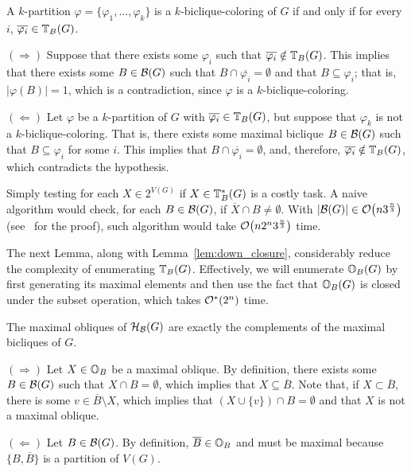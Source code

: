 \begin{lemma}
    \label{lem:transversal_colorings}
    A $k$-partition $\varphi = \{\varphi_1, \dots, \varphi_k\}$ is a $k$-biclique-coloring of $G$ if and only if for every $i$, $\overline{\varphi_i} \in \mathbb{T}_{B}(G)$.
\end{lemma}

\begin{tproof}
$(\Rightarrow)$ Suppose that there exists some $\varphi_i$ such that $\overline{\varphi_i} \notin \mathbb{T}_{B}(G)$.
This implies that there exists some $B \in \mathcal{B}(G)$ such that $B \cap \overline{\varphi_i} = \emptyset$ and that $B \subseteq \varphi_i$; that is, $|\varphi(B)| = 1$, which is a contradiction, since $\varphi$ is a $k$-biclique-coloring.

$(\Leftarrow)$ Let $\varphi$ be a $k$-partition of $G$ with $\overline{\varphi_i} \in \mathbb{T}_{B}(G)$, but suppose that $\varphi_k$ is not a $k$-biclique-coloring.
That is, there exists some maximal biclique $B \in \mathcal{B}(G)$ such that $B \subseteq \varphi_i$ for some $i$.
This implies that $B \cap \overline{\varphi_i} = \emptyset$, and, therefore, $\overline{\varphi_i} \notin \mathbb{T}_{B}(G)$, which contradicts the hypothesis.
\end{tproof}

Simply testing for each $X \in 2^{V(G)}$ if $X \in \mathbb{T}^*_{B}(G)$ is a costly task.
A naive algorithm would check, for each $B \in \mathcal{B}(G)$, if $\overline{X} \cap B \neq \emptyset$.
With $|\mathcal{B}(G)| \in \mathcal{O}\!\left(n3^{\frac{n}{3}}\right)$ (see~\citep{gaspers} for the proof), such algorithm would take $\mathcal{O}\!\left(n2^n3^{\frac{n}{3}}\right)$ time.

The next Lemma, along with Lemma~\ref{lem:down_closure}, considerably reduce the complexity of enumerating $\mathbb{T}_{B}(G)$.
Effectively, we will enumerate $\mathbb{O}_{B}(G)$ by first generating its maximal elements and then use the fact that $\mathbb{O}_{B}(G)$ is closed under the subset operation, which takes $\mathcal{O}^*\!\left(2^n\right)$ time.

\begin{lemma}
    \label{lem:complementary_obliques}
    The maximal obliques of $\mathcal{H}_{\mathcal{B}}(G)$ are exactly the complements of the maximal bicliques of $G$.
\end{lemma}

\begin{tproof}
    $(\Rightarrow)$ Let $X \in \mathbb{O}_{B}$ be a maximal oblique. By definition, there exists some $B \in \mathcal{B}(G)$ such that $X \cap B = \emptyset$, which implies that $X \subseteq \overline{B}$.
    Note that, if $X \subset \overline{B}$, there is some $v \in \overline{B} \setminus X$, which implies that $(X \cup \{v\}) \cap B = \emptyset$ and that $X$ is not a maximal oblique.
    
    $(\Leftarrow)$ Let $B \in \mathcal{B}(G)$. By definition, $\overline{B} \in \mathbb{O}_{B}$ and must be maximal because $\{B, \overline{B}\}$ is a partition of $V(G)$.
\end{tproof}

